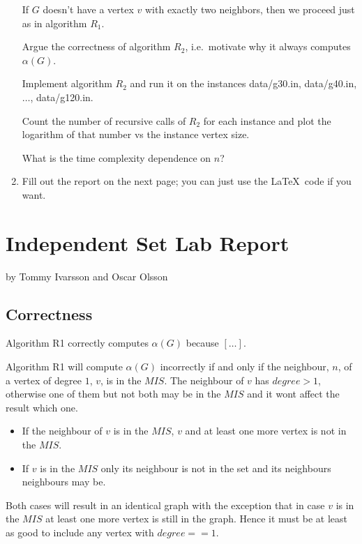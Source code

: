 \documentclass{tufte-handout}
\begin{document}
\begin{enumerate}
  If $G$ doesn't have a vertex $v$ with exactly two neighbors, then we
  proceed just as in algorithm $R_1$.
 
 Argue the correctness of algorithm $R_2$, i.e.\ motivate why it always computes $\alpha(G)$.
 
 Implement algorithm $R_2$ and run it on the instances
  data/g30.in, data/g40.in, $\ldots$, data/g120.in.

  Count the number of recursive calls of $R_2$ for each instance and plot the
  logarithm of that number vs the instance vertex size. 
  
  What is the time complexity dependence on $n$?

\item Fill out the report on the next page; you can just use the
  \LaTeX\ code if you want.
\end{enumerate}

\newpage


\newpage
\section{Independent Set Lab Report}


by Tommy Ivarsson and Oscar Olsson

\subsection{Correctness}
Algorithm R1 correctly computes $\alpha(G)$ because $[\ldots]$.

Algorithm R1 will compute $\alpha(G)$ incorrectly if and only if the neighbour,
$n$, of a vertex of degree $1$, $v$, is in the $MIS$. The neighbour of $v$ has
$degree > 1$, otherwise one of them but not both may be in the $MIS$ and it
wont affect the result which one.

\begin{itemize}
	\item If the neighbour of $v$ is in the $MIS$, $v$ and at least one more
		vertex is not in the $MIS$.
	\item If $v$ is in the $MIS$ only its neighbour is not in the set and its
		neighbours neighbours may be.
\end{itemize}

Both cases will result in an identical graph with the exception that in case $v$
is in the $MIS$ at least one more vertex is still in the graph. Hence it must be
at least as good to include any vertex with $degree == 1$.
\end{document}
